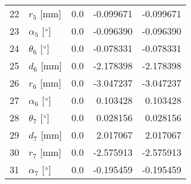 \documentclass{standalone}%
\begin{document}
\begin{tabular}{llrrr}
22 &              $r_{5}$ [mm] &       0.0 &  -0.099671 &  -0.099671 \\
23 &  $\alpha_{5}$ [$\degree$] &       0.0 &  -0.096390 &  -0.096390 \\
24 &  $\theta_{6}$ [$\degree$] &       0.0 &  -0.078331 &  -0.078331 \\
25 &              $d_{6}$ [mm] &       0.0 &  -2.178398 &  -2.178398 \\
26 &              $r_{6}$ [mm] &       0.0 &  -3.047237 &  -3.047237 \\
27 &  $\alpha_{6}$ [$\degree$] &       0.0 &   0.103428 &   0.103428 \\
28 &  $\theta_{7}$ [$\degree$] &       0.0 &   0.028156 &   0.028156 \\
29 &              $d_{7}$ [mm] &       0.0 &   2.017067 &   2.017067 \\
30 &              $r_{7}$ [mm] &       0.0 &  -2.575913 &  -2.575913 \\
31 &  $\alpha_{7}$ [$\degree$] &       0.0 &  -0.195459 &  -0.195459 \\
\bottomrule
\end{tabular}
%
\end{document}

